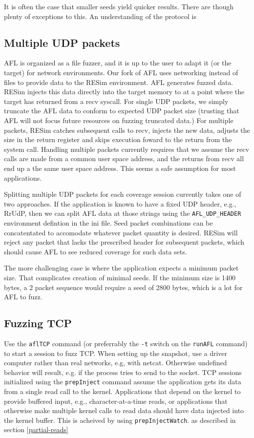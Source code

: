 \documentclass[titlepage]{article}
\begin{document}
It is often the case that smaller seeds yield quicker results.  There are though plenty of exceptions to this.  An understanding of the protocol is 

\subsection{Multiple UDP packets}
AFL is organized as a file fuzzer, and it is up to the user to adapt it (or the target) for network environments.
Our fork of AFL uses networking instead of files to provide data to the RESim environment.
AFL generates fuzzed data.  RESim injects this data directly into the target memory to at a point where the target has returned from a recv syscall.
For single UDP packets, we simply truncate the AFL data to conform to expected UDP packet size (trusting that AFL will not focus future resources on fuzzing 
truncated data.)    For multiple packets, RESim catches subsequent calls to recv, injects the new data, adjusts the size in the
return register and skips execution foward to the return from the system call.
Handling multiple packets currently requires that we assume the recv calls are made from a common user space address, and
the returns from recv all end up a the same user space address.  This seems a safe assumption for most applications.  

Splitting multiple UDP packets for each coverage session currently takes one of two approaches.  If the application is known
to have a fixed UDP header, e.g., RrUdP, then we can split AFL data at those strings using the {\tt AFL\_UDP\_HEADER} environment
defintion in the ini file.  Seed packet combinations can be concatentated
to accomodate whatever packet quantity is desired.  RESim will reject any packet that lacks the prescribed header for subsequent
packets, which should cause AFL
to see reduced coverage for such data sets.

The more challenging case is where the application expects a minimum packet size.  That complicates creation of minimal seeds.  If the
minimum size is 1400 bytes, a 2 packet sequence would require a seed of 2800 bytes, which is a lot for AFL to fuzz.

\subsection{Fuzzing TCP}
Use the {\tt aflTCP} command (or preferrably the {\tt -t} switch on the {\tt runAFL} command) to start a session to fuzz TCP.  
When setting up the snapshot, use a driver computer rather than
real networks, e.g, with netcat.  Otherwise undefined behavior will result, e.g. if the process tries to send to the socket.
TCP sessions initialized using the {\tt prepInject} command assume the application gets its data from a single read call to the kernel.
Applications that depend on the kernel to provide buffered input, e.g., character-at-a-time reads, or applications that otherwise make multiple
kernel calls to read data should have data injected into the kernel buffer.  This is acheived by using {\tt prepInjectWatch}. 
as described in section \ref{partial-reads} 
\end{document}
